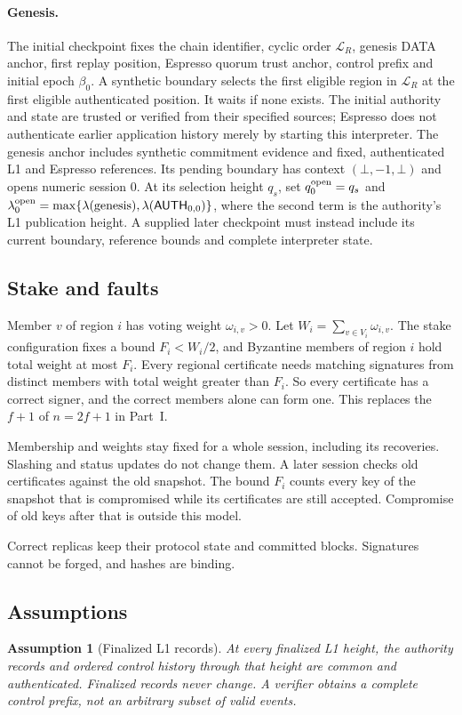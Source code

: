 \documentclass[11pt,a4paper]{article}
\newcommand{\tagg}[1]{\ensuremath{\mathsf{#1}}}
\newtheorem{assumption}[assumption]{Assumption}
\newcounter{protocol}
\begin{document}
\paragraph{Genesis.}
The initial checkpoint fixes the chain identifier, cyclic order
$\mathcal L_R$, genesis DATA anchor, first replay position, Espresso
quorum trust anchor, control prefix and initial epoch $\beta_0$.
A synthetic boundary selects the first eligible region in
$\mathcal L_R$ at the first eligible authenticated position. It waits
if none exists. The initial authority and state are trusted or verified
from their specified sources; Espresso does not authenticate earlier
application history merely by starting this interpreter.
The genesis anchor includes synthetic commitment evidence and fixed,
authenticated L1 and Espresso references. Its pending boundary has
context $(\bot,-1,\bot)$ and opens numeric session 0. At its selection
height $q_s$, set $q^{\rm open}_0=q_s$ and
$\lambda^{\rm open}_0=\max\{\lambda(\text{genesis}),
\lambda(\tagg{AUTH}_{0,0})\}$, where the second term is the authority's
L1 publication height. A supplied later checkpoint must instead include
its current boundary, reference bounds and complete interpreter state.

\subsection{Stake and faults}
\label{sec:stake}
Member $v$ of region $i$ has voting weight $\omega_{i,v}>0$. Let
$W_i=\sum_{v\in V_i}\omega_{i,v}$. The stake configuration
fixes a bound $F_i<W_i/2$, and Byzantine members of region $i$ hold
total weight at most $F_i$. Every regional certificate needs
matching signatures from distinct members with total weight greater than
$F_i$. So every certificate has a correct signer, and the correct members
alone can form one. This replaces the $f+1$ of $n=2f+1$ in Part~I.

Membership and weights stay fixed for a whole session, including its
recoveries. Slashing and status updates do not change them. A later
session checks old certificates against the old snapshot. The bound
$F_i$ counts every key of the snapshot that is compromised while its
certificates are still accepted. Compromise of old keys after that is
outside this model.

Correct replicas keep their protocol state and committed blocks.
Signatures cannot be forged, and hashes are binding.



\subsection{Assumptions}
\label{sec:assumptions}
\begin{assumption}[Finalized L1 records]
\label{ass:authority}
At every finalized L1 height, the authority records and ordered control
history through that height are common and authenticated. Finalized
records never change. A verifier obtains a complete control prefix,
not an arbitrary subset of valid events.
\end{assumption}
\end{document}
